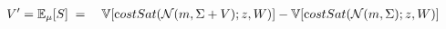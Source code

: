 \documentclass[a4paper,10pt]{article}
\newcommand{\C}{\mathbb{C}}
\newcommand{\E}{\mathbb{E}}
\newcommand{\V}{\mathbb{V}}
\newcommand{\N}{\mathcal{N}}
\newcommand{\inv}{^{-1}}
\newcommand{\T}{^{\top}}
\begin{document}
\begin{eqnarray}
 V' = \E_\mu[S]
 &\;=\;& \V[{\text costSat}(\N(m,\Sigma+V);z,W)] - \V[{\text costSat}(\N(m,\Sigma);z,W)]
\end{eqnarray}
\end{document}
